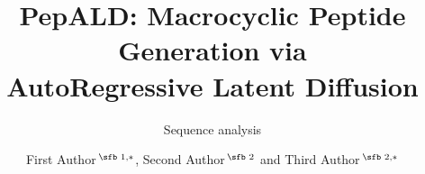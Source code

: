 \documentclass[nocrop]{bioinfo}
\begin{document}

\subtitle{Sequence analysis}

\title[PepALD]{PepALD: Macrocyclic Peptide Generation via\\ AutoRegressive Latent Diffusion}
\author[First Author \textit{et~al}.]{First Author\,$^{\text{\sfb 1,}*}$, Second Author\,$^{\text{\sfb 2}}$ and Third Author\,$^{\text{\sfb 2,}*}$}
\address{$^{\text{\sf 1}}$Department, Institution, City, Post Code, Country and \\
$^{\text{\sf 2}}$Department, Institution, City, Post Code,
Country.}


\history{}

\editor{}



\maketitle






\vspace*{-10pt}


\vspace*{-12pt}


\vspace*{-12pt}


\end{document}
